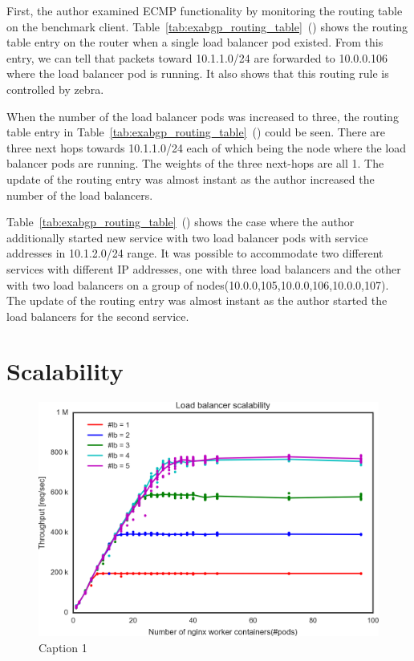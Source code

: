 First, the author examined ECMP functionality by monitoring the routing table on the benchmark client.
Table~\ref{tab:exabgp_routing_table}~() shows the routing table entry on the router when a single load balancer pod existed.
From this entry, we can tell that packets toward 10.1.1.0/24 are forwarded to 10.0.0.106 where the load balancer pod is running.
It also shows that this routing rule is controlled by zebra.

When the number of the load balancer pods was increased to three, the routing table entry in Table~\ref{tab:exabgp_routing_table}~() could be seen.
There are three next hops towards 10.1.1.0/24 each of which being the node where the load balancer pods are running.
The weights of the three next-hops are all 1.
The update of the routing entry was almost instant as the author increased the number of the load balancers.

Table~\ref{tab:exabgp_routing_table}~() shows the case where the author additionally started new service with two load balancer pods with service addresses in 10.1.2.0/24 range.
It was possible to accommodate two different services with different IP addresses, one with three load balancers and the other with two load balancers on a group of nodes(10.0.0,105,10.0.0,106,10.0.0,107).
The update of the routing entry was almost instant as the author started the load balancers for the second service.

\FloatBarrier

\section{Scalability}

\begin{figure}[h]
  \includegraphics[width=0.9\columnwidth,left]{Figs/ecmp_lb_cubic}
  \caption{Caption 1}
  \label{fig:ecmp_lb_cubic}
\end{figure}

